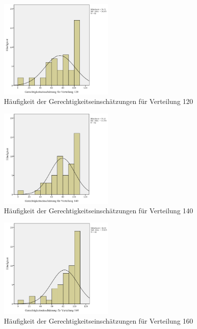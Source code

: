 \documentclass[a4paper]{thesis}
\begin{document}
\begin{figure}[H]
\centering
\includegraphics[width=0.5\textwidth]{figures/verteil_120.png}
\caption[Häufigkeit der Gerechtigkeitseinschätzungen für Verteilung 120]{Häufigkeit der Gerechtigkeitseinschätzungen für Verteilung 120}
\end{figure}

\begin{figure}[H]
\centering
\includegraphics[width=0.5\textwidth]{figures/verteil_140.png}
\caption[Häufigkeit der Gerechtigkeitseinschätzungen für Verteilung 140]{Häufigkeit der Gerechtigkeitseinschätzungen für Verteilung 140}
\end{figure}

\begin{figure}[H]
\centering
\includegraphics[width=0.5\textwidth]{figures/verteil_160.png}
\caption[Häufigkeit der Gerechtigkeitseinschätzungen für Verteilung 160]{Häufigkeit der Gerechtigkeitseinschätzungen für Verteilung 160}
\end{figure}
\end{document}
